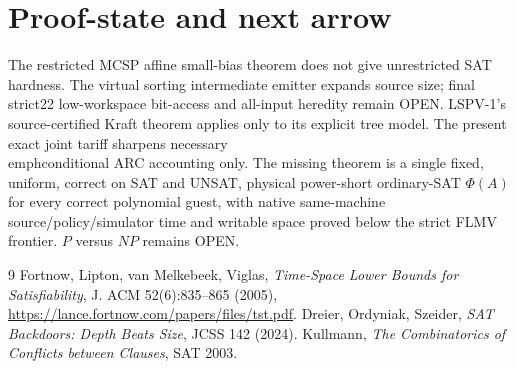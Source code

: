 \documentclass[10pt]{article}
\begin{document}
\section{Proof-state and next arrow}
The restricted MCSP affine small-bias theorem does not give unrestricted SAT hardness. The virtual sorting intermediate emitter expands source size; final strict22 low-workspace bit-access and all-input heredity remain OPEN. LSPV-1's source-certified Kraft theorem applies only to its explicit tree model. The present exact joint tariff sharpens necessary \\emph{conditional} ARC accounting only. The missing theorem is a single fixed, uniform, correct on SAT and UNSAT, physical power-short ordinary-SAT $\Phi(A)$ for every correct polynomial guest, with native same-machine source/policy/simulator time and writable space proved below the strict FLMV frontier. $P$ versus $NP$ remains OPEN.
\begin{thebibliography}{9}
 Fortnow, Lipton, van Melkebeek, Viglas, \emph{Time-Space Lower Bounds for Satisfiability}, J. ACM 52(6):835--865 (2005), \url{https://lance.fortnow.com/papers/files/tst.pdf}.
 Dreier, Ordyniak, Szeider, \emph{SAT Backdoors: Depth Beats Size}, JCSS 142 (2024).
 Kullmann, \emph{The Combinatorics of Conflicts between Clauses}, SAT 2003.
\end{thebibliography}
\end{document}
